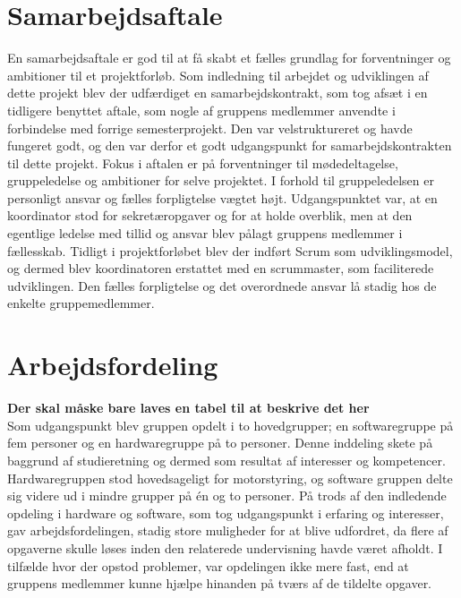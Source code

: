 \section{Samarbejdsaftale}
En samarbejdsaftale er god til at få skabt et fælles grundlag for forventninger og ambitioner til et projektforløb. Som indledning til arbejdet og udviklingen af dette projekt blev der udfærdiget en samarbejdskontrakt, som tog afsæt i en tidligere benyttet aftale, som nogle af gruppens medlemmer anvendte i forbindelse med forrige semesterprojekt. Den var velstruktureret og havde fungeret godt, og den var derfor et godt udgangspunkt for samarbejdskontrakten til dette projekt. Fokus i aftalen er på forventninger til mødedeltagelse, gruppeledelse og ambitioner for selve projektet. I forhold til gruppeledelsen er personligt ansvar og fælles forpligtelse vægtet højt. Udgangspunktet var, at en koordinator stod for sekretæropgaver og for at holde overblik, men at den egentlige ledelse med tillid og ansvar blev pålagt gruppens medlemmer i fællesskab. Tidligt i projektforløbet blev der indført Scrum som udviklingsmodel, og dermed blev koordinatoren erstattet med en scrummaster, som faciliterede udviklingen. Den fælles forpligtelse og det overordnede ansvar lå stadig hos de enkelte gruppemedlemmer.

\section{Arbejdsfordeling}
\textbf{Der skal måske bare laves en tabel til at beskrive det her} \\
Som udgangspunkt blev gruppen opdelt i to hovedgrupper; en softwaregruppe på fem personer og en hardwaregruppe på to personer. Denne inddeling skete på baggrund af studieretning og dermed som resultat af interesser og kompetencer. Hardwaregruppen stod hovedsageligt for motorstyring, og software gruppen delte sig videre ud i mindre grupper på én og to personer. På trods af den indledende opdeling i hardware og software, som tog udgangspunkt i erfaring og interesser, gav arbejdsfordelingen, stadig store muligheder for at blive udfordret, da flere af opgaverne skulle løses inden den relaterede undervisning havde været afholdt. I tilfælde hvor der opstod problemer, var opdelingen ikke mere fast, end at gruppens medlemmer kunne hjælpe hinanden på tværs af de tildelte opgaver. \\


